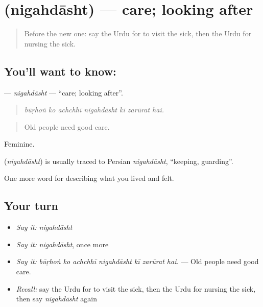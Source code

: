 \section[\texorpdfstring{\ur{نگہداشت} (nigahdāsht)}{نگہداشت (nigahdāsht)}]{ (nigahdāsht) — care; looking after}

\label{lesson:UR-C480-nigahdasht}



\begin{quote}
Before the new one: say the Urdu for to visit the sick, then the Urdu for nursing the sick.
\end{quote}

\subsection*{You'll want to know: }
\textbf{} — \emph{nigahdāsht} — \textquotedblleft{}care; looking after\textquotedblright{}.

\begin{quote}
      
\end{quote}

\begin{quote}
\emph{būṛhoṅ ko achchhī nigahdāsht kī zarūrat hai.}
\end{quote}

\begin{quote}
Old people need good care.
\end{quote}

Feminine.

\begin{cousinweb}
\textbf{} (\emph{nigahdāsht}) is usually traced to Persian \emph{nigahdāsht}, \textquotedblleft{}keeping, guarding\textquotedblright{}.
\end{cousinweb}

\begin{grammarlens}[title={What you've built}]
One more word for describing what you lived and felt.
\end{grammarlens}

\subsection*{Your turn}
\begin{itemize}
\raggedright
  \item \emph{Say it:} \emph{nigahdāsht}
  \item \emph{Say it:} \emph{nigahdāsht}, once more
  \item \emph{Say it:} \emph{būṛhoṅ ko achchhī nigahdāsht kī zarūrat hai.} — Old people need good care.
  \item \emph{Recall:} say the Urdu for to visit the sick, then the Urdu for nursing the sick, then say \emph{nigahdāsht} again
\end{itemize}

